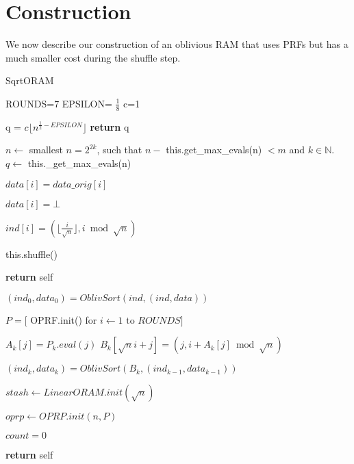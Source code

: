 
\section{Construction}

We now describe our construction of an oblivious RAM that uses PRFs
but has a much smaller cost during the shuffle step.

\begin{algorithm}
\caption{SqrtORAM}
\label{alg:oram}
\begin{algorithmic}[1]

\State ROUNDS=7
\State EPSILON= $\frac{1}{8}$
\State c=1

\State

\State q = $c \lfloor n^{\frac{1}{2} - EPSILON} \rfloor$
\State \textbf{return} q
\EndProcedure

\State


\State $n \gets$ smallest $n= 2^{2k}$, such that $n - $ this.get\_max\_evals(n) $ < m$ and $k \in \mathbb{N}$.
\State $q \gets$ this.\_get\_max\_evals(n)

   \State $data[i] = data\_orig[i]$
\EndFor

   \State $data[i] = \bot$
\EndFor
   
    \State $ind[i]  = (\lfloor{ \frac{i}{\sqrt{n}}} \rfloor ,  i \bmod \sqrt{n}) $
\EndFor

\State this.shuffle()

\State \textbf{return} self
\EndProcedure

\State


\State $(ind_0, data_0) = OblivSort(ind, (ind, data))$ \label{line:first_sort}

\State $P = [$ OPRF.init() for $i \gets 1$ to $ROUNDS]$

        \State $A_k[j] = P_k.eval(j)$ \label{line:prf_eval}
            \State $B_k[\sqrt{n} i + j] = (j, i + A_k[j] \bmod \sqrt{n})$
        \EndFor
    \EndFor
 
    \State $(ind_k, data_k) = OblivSort(B_k, (ind_{k-1}, data_{k-1}))$
        \label{line:second_sort}
  
\EndFor

\State $stash \gets LinearORAM.init(\sqrt{n})$

\State $oprp \gets OPRP.init(n, P)$

\State $count = 0$

\State \textbf{return} self

\EndProcedure

\State


\end{algorithmic}
\end{algorithm}

